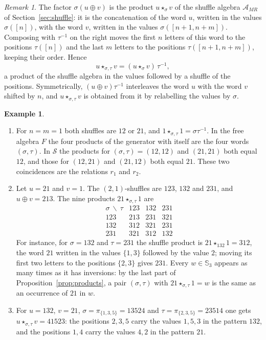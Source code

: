 \documentclass[11pt]{amsart}
\theoremstyle{definition}
\newtheorem{example}[theorem]{Example}
\theoremstyle{remark}
\newtheorem{remark}[theorem]{Remark}
\newcommand{\bS}{\mathbb{S}}
\newcommand{\cA}{\mathscr{A}}
\newcommand{\AMR}{\cA_{MR}}
\newcommand{\cS}{\mathscr{S}}
\begin{document}
\begin{remark}\label{rem:products}
The factor $\sigma(u\oplus v)$ is the product $u\star_\sigma v$ of the shuffle algebra $\AMR$ of Section~\ref{sec:shuffle}: it is the concatenation of the word $u$, written in the values $\sigma([n])$, with the word $v$, written in the values $\sigma([n+1,n+m])$. Composing with $\tau^{-1}$ on the right moves the first $n$ letters of this word to the positions $\tau([n])$ and the last $m$ letters to the positions $\tau([n+1,n+m])$, keeping their order. Hence
\[
u\star_{\sigma,\tau}v=(u\star_\sigma v)\,\tau^{-1},
\]
a product of the shuffle algebra in the values followed by a shuffle of the positions. Symmetrically, $(u\oplus v)\tau^{-1}$ interleaves the word $u$ with the word $v$ shifted by $n$, and $u\star_{\sigma,\tau}v$ is obtained from it by relabelling the values by $\sigma$.
\end{remark}

\begin{example}\label{ex:products}
\begin{enumerate}
\item For $n=m=1$ both shuffles are $12$ or $21$, and $1\star_{\sigma,\tau}1=\sigma\tau^{-1}$. In the free algebra $F$ the four products of the generator with itself are the four words $(\sigma,\tau)$. In $\cS$ the products for $(\sigma,\tau)=(12,12)$ and $(21,21)$ both equal $12$, and those for $(12,21)$ and $(21,12)$ both equal $21$. These two coincidences are the relations $r_1$ and $r_2$.
\item Let $u=21$ and $v=1$. The $(2,1)$-shuffles are $123$, $132$ and $231$, and $u\oplus v=213$. The nine products $21\star_{\sigma,\tau}1$ are
\[
\begin{array}{c|ccc}
\sigma\ \backslash\ \tau & 123 & 132 & 231\\\hline
123 & 213 & 231 & 321\\
132 & 312 & 321 & 231\\
231 & 321 & 312 & 132
\end{array}
\]
For instance, for $\sigma=132$ and $\tau=231$ the shuffle product is $21\star_{132}1=312$, the word $21$ written in the values $\{1,3\}$ followed by the value $2$; moving its first two letters to the positions $\{2,3\}$ gives $231$. Every $w\in\bS_3$ appears as many times as it has inversions: by the last part of Proposition~\ref{prop:products}, a pair $(\sigma,\tau)$ with $21\star_{\sigma,\tau}1=w$ is the same as an occurrence of $21$ in $w$.
\item For $u=132$, $v=21$, $\sigma=\pi_{\{1,3,5\}}=13524$ and $\tau=\pi_{\{2,3,5\}}=23514$ one gets $u\star_{\sigma,\tau}v=41523$: the positions $2,3,5$ carry the values $1,5,3$ in the pattern $132$, and the positions $1,4$ carry the values $4,2$ in the pattern $21$.
\end{enumerate}
\end{example}
\end{document}
